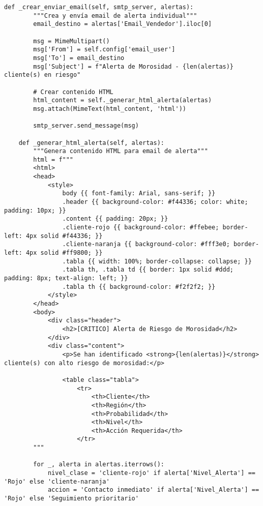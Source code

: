 \begin{verbatim}
def _crear_enviar_email(self, smtp_server, alertas):
        """Crea y envía email de alerta individual"""
        email_destino = alertas['Email_Vendedor'].iloc[0]
        
        msg = MimeMultipart()
        msg['From'] = self.config['email_user']
        msg['To'] = email_destino
        msg['Subject'] = f"Alerta de Morosidad - {len(alertas)} cliente(s) en riesgo"
        
        # Crear contenido HTML
        html_content = self._generar_html_alerta(alertas)
        msg.attach(MimeText(html_content, 'html'))
        
        smtp_server.send_message(msg)
    
    def _generar_html_alerta(self, alertas):
        """Genera contenido HTML para email de alerta"""
        html = f"""
        <html>
        <head>
            <style>
                body {{ font-family: Arial, sans-serif; }}
                .header {{ background-color: #f44336; color: white; padding: 10px; }}
                .content {{ padding: 20px; }}
                .cliente-rojo {{ background-color: #ffebee; border-left: 4px solid #f44336; }}
                .cliente-naranja {{ background-color: #fff3e0; border-left: 4px solid #ff9800; }}
                .tabla {{ width: 100%; border-collapse: collapse; }}
                .tabla th, .tabla td {{ border: 1px solid #ddd; padding: 8px; text-align: left; }}
                .tabla th {{ background-color: #f2f2f2; }}
            </style>
        </head>
        <body>
            <div class="header">
                <h2>[CRITICO] Alerta de Riesgo de Morosidad</h2>
            </div>
            <div class="content">
                <p>Se han identificado <strong>{len(alertas)}</strong> cliente(s) con alto riesgo de morosidad:</p>
                
                <table class="tabla">
                    <tr>
                        <th>Cliente</th>
                        <th>Región</th>
                        <th>Probabilidad</th>
                        <th>Nivel</th>
                        <th>Acción Requerida</th>
                    </tr>
        """
        
        for _, alerta in alertas.iterrows():
            nivel_clase = 'cliente-rojo' if alerta['Nivel_Alerta'] == 'Rojo' else 'cliente-naranja'
            accion = 'Contacto inmediato' if alerta['Nivel_Alerta'] == 'Rojo' else 'Seguimiento prioritario'
            

\end{verbatim}
